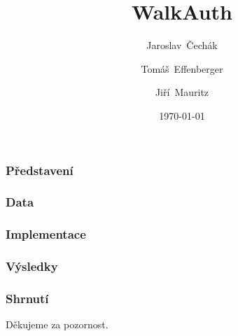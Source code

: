 \documentclass[xcolor=dvipsnames, 14pt]{beamer}
\title{WalkAuth}
\author{Jaroslav~Čechák \and Tomáš~Effenberger \and  Jiří~Mauritz }
\institute{Fakulta informatiky Masarykovy univerzity}
\date{\today}
\begin{document}
\begin{frame}
\titlepage
\end{frame}

\begin{frame}
\frametitle{Představení}

\end{frame}

\begin{frame}
\frametitle{Data}

\end{frame}

\begin{frame}
\frametitle{Implementace}

\end{frame}

\begin{frame}
\frametitle{Výsledky}

\end{frame}

\begin{frame}
\frametitle{Shrnutí}

\end{frame}

\begin{frame}
\begin{center}
Děkujeme za pozornost.
\end{center}
\end{frame}
\end{document}
